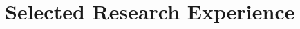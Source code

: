 \documentclass[a4paper,12pt]{article}
\begin{document}


\section{Selected Research Experience}
\end{document}
